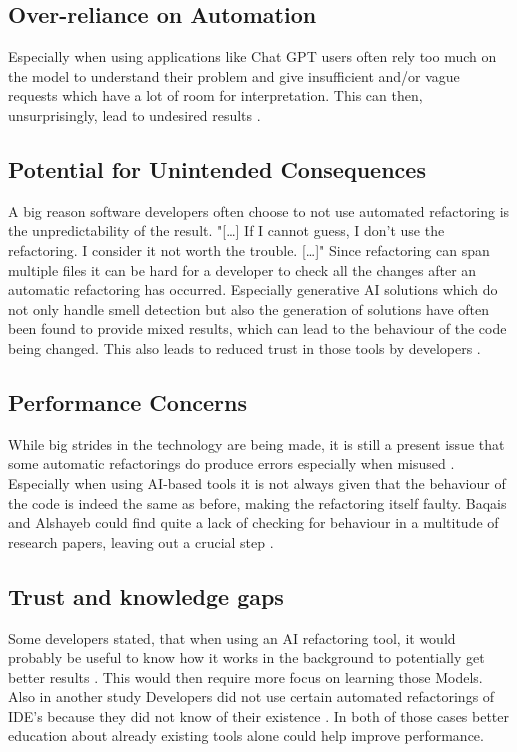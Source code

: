 \subsection{Over-reliance on Automation}
Especially when using applications like Chat GPT users often rely too much on the model to understand their problem and give insufficient and/or vague requests which have a lot of room for interpretation. This can then, unsurprisingly, lead to undesired results \cite{alomar2024refactor}.

\subsection{Potential for Unintended Consequences}
A big reason software developers often choose to not use automated refactoring is the unpredictability of the result. 
"[…] If I cannot guess, I don't use the refactoring. I consider it not worth the trouble. […]" \cite{usedisuserefactor} Since refactoring can span multiple files it can be hard for a developer to check all the changes after an automatic refactoring has occurred.
Especially generative AI solutions which do not only handle smell detection but also the generation of solutions have often been found to provide mixed results, which can lead to the behaviour of the code being changed. This also leads to reduced trust in those tools by developers \cite{10.1145/3397481.3450656}.

\subsection{Performance Concerns}
While big strides in the technology are being made, it is still a present issue that some automatic refactorings do produce errors especially when misused \cite{7833023}. 
Especially when using AI-based tools it is not always given that the behaviour of the code is indeed the same as before, making the refactoring itself faulty. Baqais and Alshayeb could find quite a lack of checking for behaviour in a multitude of research papers, leaving out a crucial step \cite{baqais2020automatic}.

\subsection{Trust and knowledge gaps}
Some developers stated, that when using an AI refactoring tool, it would probably be useful to know how it works in the background to potentially get better results \cite{10.1145/3397481.3450656}.
This would then require more focus on learning those Models. Also in another study Developers did not use certain automated refactorings of IDE's because they did not know of their existence \cite{negara2013comparative}.
In both of those cases better education about already existing tools alone could help improve performance.
